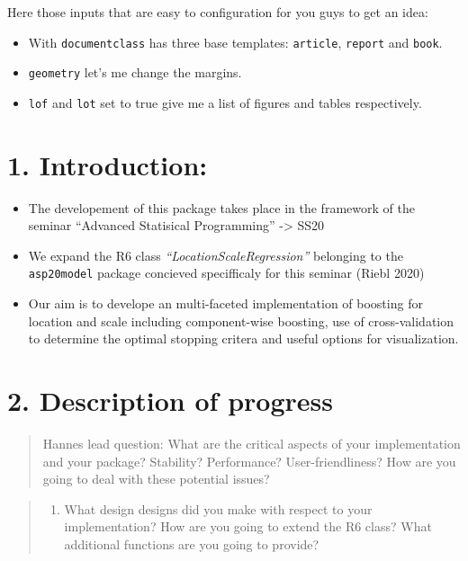 \documentclass[
]{report}
\providecommand{\tightlist}{%
  \setlength{\itemsep}{0pt}\setlength{\parskip}{0pt}}
\begin{document}
Here those inputs that are easy to configuration for you guys to get an
idea:

\begin{itemize}
\tightlist
\item
  With \texttt{documentclass} has three base templates:
  \texttt{article}, \texttt{report} and \texttt{book}.
\item
  \texttt{geometry} let's me change the margins.
\item
  \texttt{lof} and \texttt{lot} set to true give me a list of figures
  and tables respectively.
\end{itemize}

\hypertarget{introduction}{%
\chapter{1. Introduction:}\label{introduction}}

\begin{itemize}
\tightlist
\item
  The developement of this package takes place in the framework of the
  seminar ``Advanced Statisical Programming'' -\textgreater{} SS20
\item
  We expand the R6 class \emph{``LocationScaleRegression''} belonging to
  the \texttt{asp20model} package concieved specifficaly for this
  seminar (Riebl 2020)
\item
  Our aim is to develope an multi-faceted implementation of boosting for
  location and scale including component-wise boosting, use of
  cross-validation to determine the optimal stopping critera and useful
  options for visualization.
\end{itemize}

\hypertarget{description-of-progress}{%
\chapter{2. Description of progress}\label{description-of-progress}}

\begin{quote}
Hannes lead question: What are the critical aspects of your
implementation and your package? Stability? Performance?
User-friendliness? How are you going to deal with these potential
issues?
\end{quote}

\begin{quote}
\begin{enumerate}
\def\labelenumi{\arabic{enumi}.}
\setcounter{enumi}{1}
\tightlist
\item
  What design designs did you make with respect to your implementation?
  How are you going to extend the R6 class? What additional functions
  are you going to provide?
\end{enumerate}
\end{quote}
\end{document}
